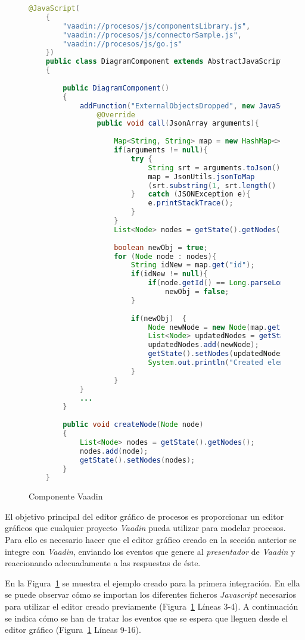 \begin{figure}[H]
	\centering
	\begin{lstlisting}[language=Java]
	@JavaScript(
	{
		"vaadin://procesos/js/componentsLibrary.js",
		"vaadin://procesos/js/connectorSample.js",
		"vaadin://procesos/js/go.js"
	})
	public class DiagramComponent extends AbstractJavaScriptComponent
	{
	
		public DiagramComponent()
		{
			addFunction("ExternalObjectsDropped", new JavaScriptFunction(){
				@Override
				public void call(JsonArray arguments){
			
					Map<String, String> map = new HashMap<>();
					if(arguments != null){
						try	{
							String srt = arguments.toJson();
							map = JsonUtils.jsonToMap
							(srt.substring(1, srt.length() - 1));
						}	catch (JSONException e){
							e.printStackTrace();
						}
					}
					List<Node> nodes = getState().getNodes();
			
					boolean newObj = true;
					for (Node node : nodes){
						String idNew = map.get("id");
						if(idNew != null){
							if(node.getId() == Long.parseLong(map.get("id")))
								newObj = false;
						}
			
						if(newObj)	{
							Node newNode = new Node(map.get("name"),map.get("loc"));
							List<Node> updatedNodes = getState().getNodes();
							updatedNodes.add(newNode);
							getState().setNodes(updatedNodes);
							System.out.println("Created element :"+map.get("name"));
						}
					}
			}
			...
		}
		
		public void createNode(Node node)
		{
			List<Node> nodes = getState().getNodes();
			nodes.add(node);
			getState().setNodes(nodes);
		}
	}\end{lstlisting}
	\caption{Componente Vaadin}
	\label{fig:vaadinComponent}
\end{figure}


El objetivo principal del editor gráfico de procesos es proporcionar un editor gráficos que cualquier proyecto \emph{Vaadin} pueda utilizar para modelar procesos. Para ello es necesario hacer que el editor gráfico creado en la sección anterior se integre con \emph{Vaadin}, enviando los eventos que genere al \emph{presentador} de \emph{Vaadin} y reaccionando adecuadamente a las respuestas de éste. 

En la Figura~\ref{fig:vaadinComponent} se muestra el ejemplo creado para la primera integración. En ella se puede observar cómo se importan los diferentes ficheros \emph{Javascript} necesarios para utilizar el editor creado previamente (Figura~\ref{fig:vaadinComponent} Líneas 3-4). A continuación se indica cómo se han de tratar los eventos que se espera que lleguen desde el editor gráfico (Figura~\ref{fig:vaadinComponent} Líneas 9-16). 

